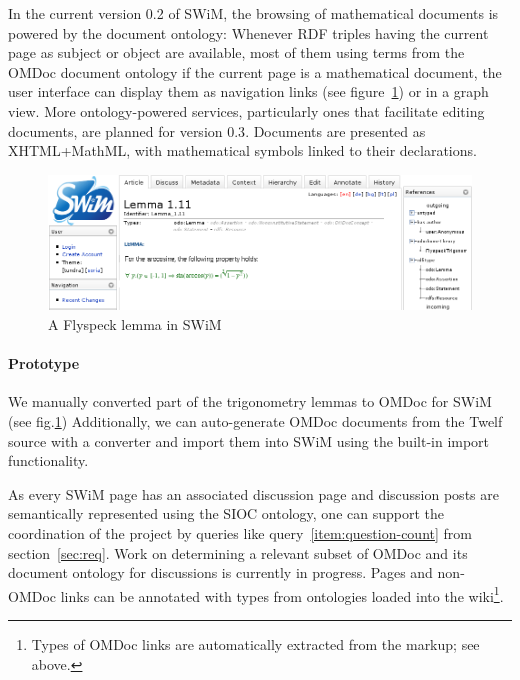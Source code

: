In the current version 0.2 of SWiM, the browsing of mathematical documents is
powered by the document ontology: Whenever RDF triples having the current page
as subject or object are available, most of them using terms from the OMDoc
document ontology if the current page is a mathematical document, the
 user interface can display them as navigation links (see
figure~\ref{fig:swim-lemma}) or in a graph view.  More ontology-powered
services, particularly ones that facilitate editing documents, are planned for
version 0.3\cite{swim-roadmap,Lange:SWiMSciColl07}.  Documents are presented as
XHTML+MathML, with mathematical symbols linked to their declarations.

\begin{figure}
  \centering
  \includegraphics[width=\textwidth]{images/swim-lemma}
  \caption{A Flyspeck lemma in SWiM}
  \label{fig:swim-lemma}
\end{figure}

\paragraph{Prototype} We manually converted part of the trigonometry lemmas to
OMDoc for SWiM (see fig.\~\ref{fig:swim-lemma})  Additionally,
we can auto-generate OMDoc documents from the Twelf source with a converter and
import them into SWiM using the built-in import functionality.

As every SWiM page has an associated discussion page and discussion posts are
semantically represented using the SIOC ontology\cite{SIOC:web}, one can support
the coordination of the project by queries like query~\ref{item:question-count}
from section~\ref{sec:req}.  Work on determining a relevant subset of OMDoc and
its document ontology for discussions is currently in progress.  Pages and non-OMDoc
links can be annotated with types from ontologies loaded into the
wiki\footnote{Types of OMDoc links are automatically extracted from the markup;
  see above.}.

